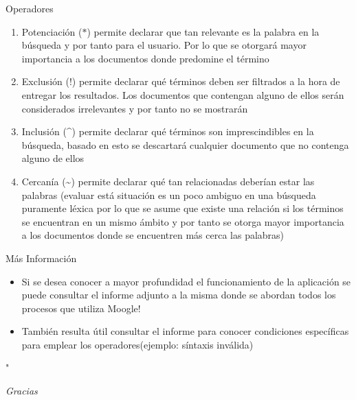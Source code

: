 \documentclass[options]{beamer}
\begin{document}
\begin{frame}{Operadores}
    \begin{enumerate}
        \item Potenciación ($\ast $) permite declarar que tan relevante es la palabra en la búsqueda y por tanto para el usuario. Por lo que se otorgará mayor importancia a los documentos donde predomine el término
        \item Exclusión (!) permite declarar qué términos deben ser filtrados a la hora de entregar los resultados. Los documentos que contengan alguno de ellos serán considerados irrelevantes y por tanto no se mostrarán
        \item Inclusión (\textasciicircum) permite declarar qué términos son imprescindibles en la búsqueda, basado en esto se descartará cualquier documento que no contenga alguno de ellos
        \item Cercanía (\textasciitilde) permite declarar qué tan  relacionadas deberían estar las palabras (evaluar está situación es un poco ambiguo en una búsqueda puramente léxica por lo que se asume que existe una relación si los términos se encuentran en un mismo ámbito y por tanto se otorga mayor importancia a los documentos donde se encuentren más cerca las palabras)
    \end{enumerate}
\end{frame}

\begin{frame}{Más Información}
    \begin{itemize}
        \item Si se desea conocer a mayor profundidad el funcionamiento de la aplicación se puede consultar el informe adjunto a la misma donde se abordan todos los procesos que utiliza Moogle!
        \item También resulta útil consultar el informe para conocer condiciones específicas para emplear los operadores(ejemplo: síntaxis inválida)
    \end{itemize}
\end{frame}

\begin{frame}{"}
    \begin{center}
        \emph{\Huge Gracias}
    \end{center}
\end{frame}
\end{document}
